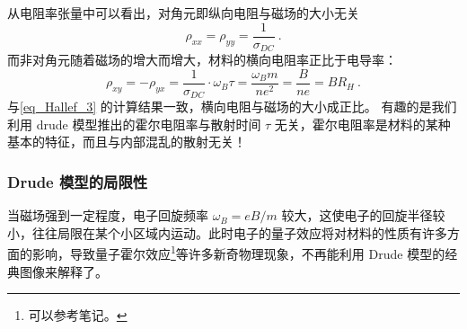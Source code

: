从电阻率张量中可以看出，对角元即纵向电阻与磁场的大小无关
\begin{equation}
\rho_{xx}=\rho_{yy}=\frac{1}{\sigma_{DC}} ~.
\end{equation}
而非对角元随着磁场的增大而增大，材料的横向电阻率正比于电导率：
\begin{equation}
\rho_{xy}=-\rho_{yx} = \frac{1}{\sigma_{DC}}\cdot \omega_B\tau=\frac{\omega_B m}{ne^2}=\frac{B}{ne}=BR_H~.
\end{equation}
与\autoref{eq_Hallef_3} 的计算结果一致，横向电阻与磁场的大小成正比。
有趣的是我们利用 drude 模型推出的霍尔电阻率与散射时间 $\tau$ 无关，霍尔电阻率是材料的某种基本的特征，而且与内部混乱的散射无关！

\subsubsection{Drude 模型的局限性}
当磁场强到一定程度，电子回旋频率 $\omega_B=eB/m$ 较大，这使电子的回旋半径较小，往往局限在某个小区域内运动。此时电子的量子效应将对材料的性质有许多方面的影响，导致量子霍尔效应\footnote{可以参考笔记。}等许多新奇物理现象，不再能利用 Drude 模型的经典图像来解释了。
